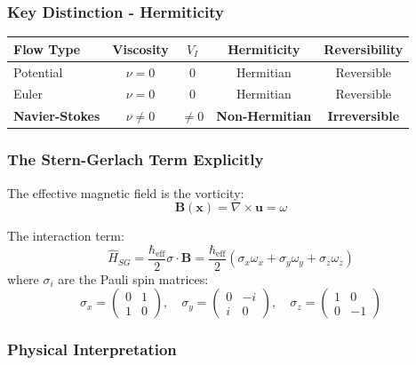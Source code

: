 \documentclass[11pt]{article}
\begin{document}
\subsubsection{Key Distinction - Hermiticity}

\begin{center}
\begin{tabular}{|l|c|c|c|c|}
\hline
\textbf{Flow Type} & \textbf{Viscosity} & $V_I$ & \textbf{Hermiticity} & \textbf{Reversibility} \\
\hline
Potential & $\nu = 0$ & 0 & Hermitian & Reversible \\
Euler & $\nu = 0$ & 0 & Hermitian & Reversible \\
\textbf{Navier-Stokes} & $\nu \neq 0$ & $\neq 0$ & \textbf{Non-Hermitian} & \textbf{Irreversible} \\
\hline
\end{tabular}
\end{center}

\subsubsection{The Stern-Gerlach Term Explicitly}

The effective magnetic field is the vorticity:
\begin{equation}
\mathbf{B}(\mathbf{x}) = \nabla \times \mathbf{u} = \omega
\end{equation}

The interaction term:
\begin{equation}
\hat{H}_{SG} = \frac{\hbar_{\text{eff}}}{2}\sigma \cdot \mathbf{B} = \frac{\hbar_{\text{eff}}}{2}(\sigma_x \omega_x + \sigma_y \omega_y + \sigma_z \omega_z)
\end{equation}
where $\sigma_i$ are the Pauli spin matrices:
\begin{equation}
\sigma_x = \begin{pmatrix} 0 & 1 \\ 1 & 0 \end{pmatrix}, \quad
\sigma_y = \begin{pmatrix} 0 & -i \\ i & 0 \end{pmatrix}, \quad
\sigma_z = \begin{pmatrix} 1 & 0 \\ 0 & -1 \end{pmatrix}
\end{equation}

\subsubsection{Physical Interpretation}
\end{document}
